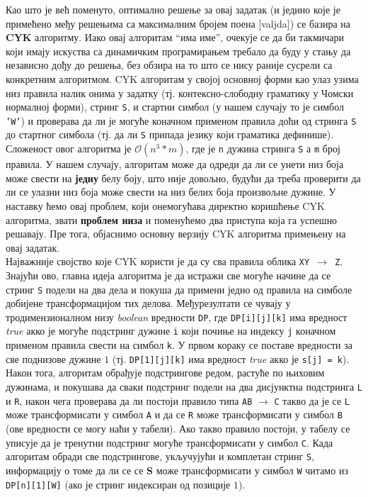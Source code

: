 \documentclass[a4wide]{article}
\begin{document}
\noindent Као што је већ поменуто, оптимално решење за овај задатак (и једино које је примећено међу решењима са максималним бројем поена [valjda]) се базира на {\bf CYK} алгоритму. Иако овај алгоритам ``има име'', очекује се да би такмичари који имају искуства са динамичким програмирањем требало да буду у стању да независно дођу до решења, без обзира на то што се нису раније сусрели са конкретним алгоритмом. CYK алгоритам у својој основној форми као улаз узима низ правила налик онима у задатку (тј. контексно-слободну граматику у Чомски нормалној форми), стринг {\tt S}, и стартни симбол (у нашем случају то је симбол {\tt 'W'}) и проверава да ли је могуће коначном применом правила доћи од стринга {\tt S} до стартног симбола (тј. да ли {\tt S} припада језику који граматика дефинише). Сложеност овог алгоритма је $\mathcal{O}(n^3 * m)$, где је {\tt n} дужина стринга {\tt S} а {\tt m} број правила. У нашем случају, алгоритам може да одреди да ли се унети низ боја може свести на {\bf једну} белу боју, што није довољно, будући да треба проверити да ли се улазни низ боја може свести на низ белих боја произвољне дужине. У наставку ћемо овај проблем, који онемогућава директно коришћење CYK алгоритма, звати {\bf проблем низа} и поменућемо два приступа која га успешно решавају. Пре тога, објаснимо основну верзију CYK алгоритма примењену на овај задатак. \\

\noindent Најважније својство које CYK користи је да су сва правила облика {\tt XY $\to$ Z}. Знајући ово, главна идеја алгоритма је  да истражи све могуће начине да се стринг {\tt S} подели на два дела и покуша да примени једно од правила на симболе добијене трансформацијом тих делова. Међурезултати се чувају у тродимензионалном низу \textit{boolean} вредности {\tt DP}, где {\tt DP[i][j][k]} има вредност \textit{true} акко је могуће подстринг дужине {\tt i} који почиње на индексу {\tt j} коначном применом правила свести на симбол {\tt k}. У првом кораку се поставе вредности за све поднизове дужине $1$ (тј. {\tt  DP[1][j][k]} има вредност \textit{true} акко је {\tt s[j] = k}). Након тога, алгоритам обрађује подстрингове редом, растуће по њиховим дужинама, и покушава да сваки подстринг подели на два дисјунктна подстринга {\tt L} и {\tt R}, 
након чега проверава да ли постоји правило типа {\tt AB} $\to$ {\tt  C} такво да је се {\tt L} може трансформисати у симбол {\tt A} и да се {\tt R} може трансформисати у симбол {\tt B} (ове вредности се могу наћи у табели). Ако такво правило постоји, у табелу се уписује да је тренутни подстринг могуће трансформисати у симбол {\tt C}. Када алгоритам обради све подстрингове, укључујући и комплетан стринг {\tt S}, информацију о томе да ли се се {\bf S} може трансформисати у симбол {\tt W} читамо из {\tt DP[n][1][W]} (ако је стринг индексиран од позиције $1$). \\
\end{document}
